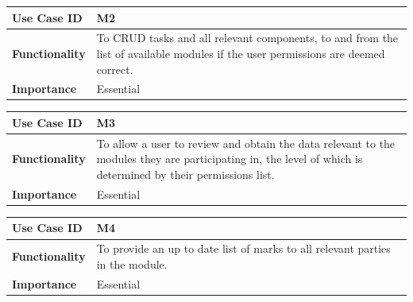 \documentclass[a4paper,12pt]{article}
\begin{document}
	        \begin{center}
	        	\begin{tabularx}{\textwidth}{ |X|X| }
	        		
	        		\hline
	        		\textbf{Use Case ID} & M2 \\
	        		\hline
	        		\textbf{Functionality} & To CRUD tasks and all relevant components, to and from the list of available modules if the user permissions are deemed correct. \\
	        		\hline
	        		\textbf{Importance} & Essential \\
	        		\hline
	        		
	        	\end{tabularx}
	        \end{center}
        
        	\begin{center}
        		\begin{tabularx}{\textwidth}{ |X|X| }
        			
        			\hline
        			\textbf{Use Case ID} & M3 \\
        			\hline
        			\textbf{Functionality} & To allow a user to review and obtain the data relevant to the modules they are participating in, the level of which is determined by their permissions list. \\
        			\hline
        			\textbf{Importance} & Essential \\
        			\hline
        			
        		\end{tabularx}
        	\end{center}
        
        	\begin{center}
        		\begin{tabularx}{\textwidth}{ |X|X| }
        			
        			\hline
        			\textbf{Use Case ID} & M4 \\
        			\hline
        			\textbf{Functionality} & To provide an up to date list of marks to all relevant parties in the module. \\
        			\hline
        			\textbf{Importance} & Essential \\
        			\hline
        			
        		\end{tabularx}
        	\end{center}
        
\end{document}
